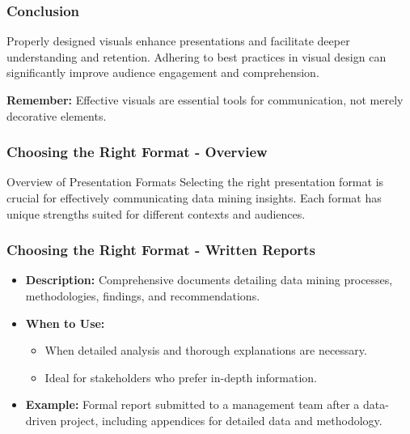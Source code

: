 \documentclass{beamer}
\begin{document}
\begin{frame}[fragile]
    \frametitle{Conclusion}
    \begin{block}{}
        Properly designed visuals enhance presentations and facilitate deeper understanding and retention. Adhering to best practices in visual design can significantly improve audience engagement and comprehension.
    \end{block}
    \begin{block}{}
        \textbf{Remember:} Effective visuals are essential tools for communication, not merely decorative elements.
    \end{block}
\end{frame}

\begin{frame}[fragile]
    \frametitle{Choosing the Right Format - Overview}
    \begin{block}{Overview of Presentation Formats}
    Selecting the right presentation format is crucial for effectively communicating data mining insights. Each format has unique strengths suited for different contexts and audiences.
    \end{block}
\end{frame}

\begin{frame}[fragile]
    \frametitle{Choosing the Right Format - Written Reports}
    \begin{itemize}
        \item \textbf{Description:} Comprehensive documents detailing data mining processes, methodologies, findings, and recommendations.
        \item \textbf{When to Use:}
        \begin{itemize}
            \item When detailed analysis and thorough explanations are necessary.
            \item Ideal for stakeholders who prefer in-depth information.
        \end{itemize}
        \item \textbf{Example:} Formal report submitted to a management team after a data-driven project, including appendices for detailed data and methodology.
    \end{itemize}
\end{frame}
\end{document}

